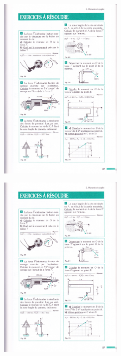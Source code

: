\documentclass[10pt]{article}
\begin{document}
\begin{minipage}[c]{.45\linewidth}
\begin{center}
\includegraphics[width=6cm]{images/moment4.pdf}
\end{center}
\end{minipage} \hfill
\begin{minipage}[c]{.45\linewidth}
\begin{center}
\includegraphics[width=6cm]{images/moment5.pdf}
\end{center}
\end{minipage} 
\end{document}

